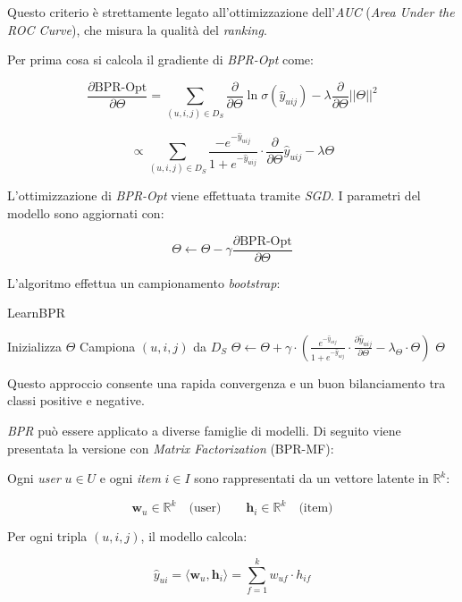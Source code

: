Questo criterio è strettamente legato all'ottimizzazione dell'\textit{AUC} (\textit{Area Under the ROC Curve}), che misura la qualità del \textit{ranking}.

Per prima cosa si calcola il gradiente di \textit{BPR-Opt} come:

\[
\frac{\partial \text{BPR-Opt}}{\partial \Theta} =
\sum_{(u,i,j) \in D_S} 
\frac{\partial}{\partial \Theta} \ln \sigma(\hat{y}_{uij}) - 
\lambda \frac{\partial}{\partial \Theta} ||\Theta||^2
\]

\[
\propto 
\sum_{(u,i,j) \in D_S} 
\frac{-e^{-\hat{y}_{uij}}}{1 + e^{-\hat{y}_{uij}}} 
\cdot \frac{\partial}{\partial \Theta} \hat{y}_{uij} 
- \lambda \Theta
\]

L'ottimizzazione di \textit{BPR-Opt} viene effettuata tramite \textit{SGD}. I parametri del modello sono aggiornati con:

\[
\Theta \gets \Theta - \gamma \frac{\partial \text{BPR-Opt}}{\partial \Theta}
\]


L'algoritmo effettua un campionamento \textit{bootstrap}:

\begin{algorithm}[H]
\caption{LearnBPR}
\begin{algorithmic}[1]
    \State Inizializza $\Theta$
    \Repeat
        \State Campiona $(u, i, j)$ da $D_S$
        \State $\Theta \gets \Theta + \gamma \cdot \left( \frac{e^{-\hat{y}_{uij}}}{1 + e^{-\hat{y}_{uij}}} \cdot \frac{\partial \hat{y}_{uij}}{\partial \Theta} - \lambda_\Theta \cdot \Theta \right)$
    \State \Return $\Theta$
\EndProcedure
\end{algorithmic}
\end{algorithm}

Questo approccio consente una rapida convergenza e un buon bilanciamento tra classi positive e negative.

\textit{BPR} può essere applicato a diverse famiglie di modelli. Di seguito viene presentata la versione con \textit{Matrix Factorization} (BPR-MF):

Ogni \textit{user} $u \in U$ e ogni \textit{item} $i \in I$ sono rappresentati da un vettore latente in $\mathbb{R}^k$:

\[
\mathbf{w}_u \in \mathbb{R}^k \quad \text{(user)} \qquad
\mathbf{h}_i \in \mathbb{R}^k \quad \text{(item)}
\]


Per ogni tripla $(u, i, j)$, il modello calcola:

\[
\hat{y}_{ui} = \langle \mathbf{w}_u, \mathbf{h}_i \rangle = \sum_{f=1}^{k} w_{uf} \cdot h_{if}
\]

